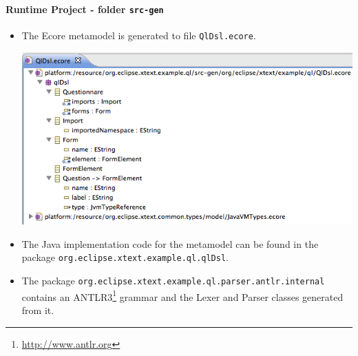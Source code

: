 \paragraph{Runtime Project - folder \texttt{src-gen}}
\begin{itemize}
  \item The Ecore metamodel is generated to file \texttt{QlDsl.ecore}.

\includegraphics[width=16cm]{./images/chapter01/QlDsl_ecore.png}

  \item The Java implementation code for the metamodel can be found in the
  package \texttt{org.eclipse.xtext.example.ql.qlDsl}.
  \item The package \texttt{org.eclipse.xtext.example.ql.parser.antlr.internal}
  contains an ANTLR3\footnote{\url{http://www.antlr.org}} grammar and the Lexer
  and Parser classes generated from it.
\end{itemize}


